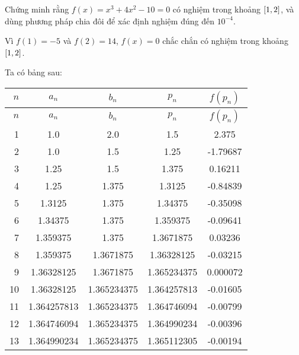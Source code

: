 \documentclass[../../Lectures.tex]{subfiles}
\begin{document}
\begin{exmp}
    Chứng minh rằng \(f(x) = x^3 + 4x^2 - 10 = 0\) có nghiệm trong khoảng
    \(\interval{1}{2}\), và dùng phương pháp chia đôi để xác định nghiệm đúng
    đến \(10^{-4}\).

    Vì \(f(1) = -5\) và \(f(2) = 14\), \(f(x) = 0\) chắc chắn có nghiệm trong
    khoảng \(\interval{1}{2}\).

    Ta có bảng sau:

    \begin{longtable}{ r S[table-format=1.9] S[table-format=1.9] S[table-format=1.9] S[table-format=-1.6] }    %
        \toprule
         {\(n\)} &   {\(a_n\)}   &   {\(b_n\)}   &   {\(p_n\)}   & {\(f(p_n)\)} \\
        \midrule
        \endfirsthead
         {\(n\)} &   {\(a_n\)}   &   {\(b_n\)}   &   {\(p_n\)}   & {\(f(p_n)\)} \\
        \midrule
          &  1.0          &  2.0          &  1.5          &   2.375      \\
              2  &  1.0          &  1.5          &  1.25         &  -1.79687    \\
              3  &  1.25         &  1.5          &  1.375        &   0.16211    \\
              4  &  1.25         &  1.375        &  1.3125       &  -0.84839    \\
              5  &  1.3125       &  1.375        &  1.34375      &  -0.35098    \\
              6  &  1.34375      &  1.375        &  1.359375     &  -0.09641    \\
              7  &  1.359375     &  1.375        &  1.3671875    &   0.03236    \\
              8  &  1.359375     &  1.3671875    &  1.36328125   &  -0.03215    \\
              9  &  1.36328125   &  1.3671875    &  1.365234375  &   0.000072   \\
             10  &  1.36328125   &  1.365234375  &  1.364257813  &  -0.01605    \\
             11  &  1.364257813  &  1.365234375  &  1.364746094  &  -0.00799    \\
             12  &  1.364746094  &  1.365234375  &  1.364990234  &  -0.00396    \\
             13  &  1.364990234  &  1.365234375  &  1.365112305  &  -0.00194    \\
        \bottomrule
    \end{longtable}


\end{exmp}
\end{document}
